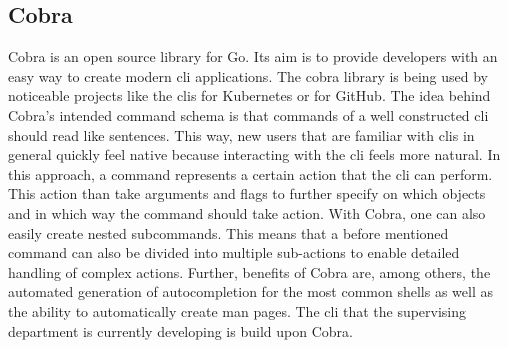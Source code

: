 
\subsection{Cobra}
Cobra is an open source library for Go.
Its aim is to provide developers with an easy way to create modern \ac{cli} applications.
The cobra library is being used by noticeable projects like the \ac{cli}s for Kubernetes or for GitHub.
The idea behind Cobra's intended command schema is that commands of a well constructed \ac{cli} should read like sentences.
This way, new users that are familiar with \acp{cli} in general quickly feel native because interacting with the \ac{cli} feels more natural.
In this approach, a command represents a certain action that the \ac{cli} can perform.
This action than take arguments and flags to further specify on which objects and in which way the command should take action.
With Cobra, one can also easily create nested subcommands.
This means that a before mentioned command can also be divided into multiple sub-actions to enable detailed handling of complex actions.
Further, benefits of Cobra are, among others, the automated generation of autocompletion for the most common shells as well as the ability to automatically create man pages. \cite{cobra.github, cobra.dev}
The \ac{cli} that the supervising department is currently developing is build upon Cobra.



